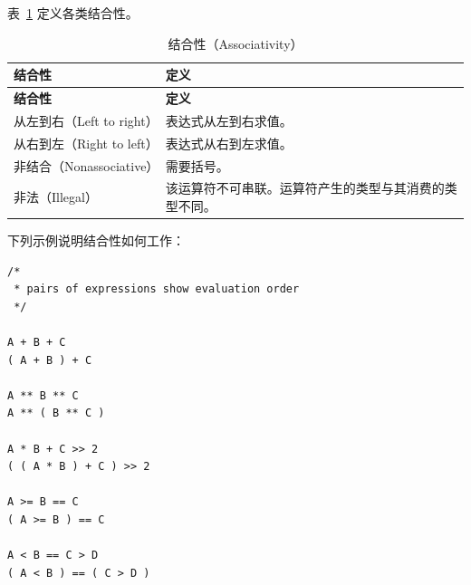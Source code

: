 表~\ref{tab:pxl-associativity} 定义各类结合性。

\begin{longtable}{@{}p{} p{}@{}}
\caption{结合性（Associativity）}\label{tab:pxl-associativity}\\
\toprule
\textbf{结合性} & \textbf{定义} \\
\midrule
\endfirsthead
\toprule
\textbf{结合性} & \textbf{定义} \\
\midrule
\endhead
\bottomrule
\endfoot
从左到右（Left to right） & 表达式从左到右求值。 \\
从右到左（Right to left） & 表达式从右到左求值。 \\
非结合（Nonassociative） & 需要括号。 \\
非法（Illegal） & 该运算符不可串联。运算符产生的类型与其消费的类型不同。 \\
\end{longtable}

下列示例说明结合性如何工作：
\begin{lstlisting}[style=pxl]
/*
 * pairs of expressions show evaluation order
 */

A + B + C
( A + B ) + C

A ** B ** C
A ** ( B ** C )

A * B + C >> 2
( ( A * B ) + C ) >> 2

A >= B == C
( A >= B ) == C

A < B == C > D
( A < B ) == ( C > D )
\end{lstlisting}
